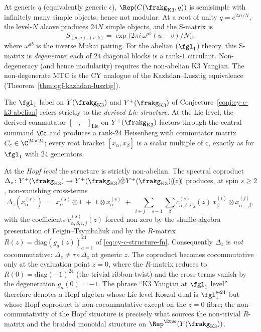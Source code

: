 \begin{remark}
\label{rem:cy-c-root-of-unity}
At generic $q$ (equivalently generic $\epsilon$), $\Rep(C(\frakg_{\mathrm{K3}}, q))$ is semisimple with infinitely many simple objects, hence not modular. At a root of unity $q = e^{2\pi i/N}$, the level-$N$ alcove produces $24 N$ simple objects, and the S-matrix is
\[
 S_{(u,a),(v,b)} = \exp\!\bigl(2\pi i \,\omega^{ab}(u - v)/N\bigr),
\]
where $\omega^{ab}$ is the inverse Mukai pairing. For the abelian ($\fgl_1$) theory, this S-matrix is \emph{degenerate}: each of $24$ diagonal blocks is a rank-$1$ circulant. Non-degeneracy (and hence modularity) requires the non-abelian K3 Yangian. The non-degenerate MTC is the CY analogue of the Kazhdan--Lusztig equivalence (Theorem~\ref{thm:qgf-kazhdan-lusztig}).
\end{remark}

\begin{remark}
\label{rem:qgf-k3-yangian-abelian-lie-nonabelian-hopf}
The $\fgl_1$ label on $Y(\frakg_{\mathrm{K3}})$ and $Y^+(\frakg_{\mathrm{K3}})$ of
Conjecture~\ref{conj:cy-c-k3-abelian} refers strictly to the
\emph{derived Lie structure}. At the Lie level, the derived commutator
$[-,-]_{\mathrm{Lie}}$ on $Y^+(\frakg_{\mathrm{K3}})$ factors through the central
summand $\C\mathsf c$ and produces a rank-$24$ Heisenberg with commutator
matrix $C_c\in\C^{24\times 24}$; every root bracket $[x_\alpha,x_\beta]$
is a scalar multiple of $\mathsf c$, exactly as for $\fgl_1$ with $24$ generators.

At the \emph{Hopf level} the structure is strictly non-abelian. The
spectral coproduct $\Delta_z\colon Y^+(\frakg_{\mathrm{K3}})\to
Y^+(\frakg_{\mathrm{K3}})\hat\otimes Y^+(\frakg_{\mathrm{K3}})(\!(z)\!)$
produces, at spin $s\geq 2$, non-vanishing cross-terms
\[
 \Delta_z(x_\alpha^{(s)})\;=\;x_\alpha^{(s)}\otimes 1\;+\;1\otimes x_\alpha^{(s)}
 \;+\;\sum_{i+j=s-1}\sum_\beta
 c^{(s)}_{\alpha,\beta,i,j}(z)\,x_\beta^{(i)}\otimes x_{\alpha-\beta}^{(j)},
\]
with the coefficients $c^{(s)}_{\alpha,\beta,i,j}(z)$ forced
non-zero by the shuffle-algebra presentation of Feigin--Tsymbaliuk and
by the $R$-matrix $R(z)=\mathrm{diag}(g_a(z))_{a=1}^{24}$ of
\eqref{eq:cy-c-structure-fn}. Consequently $\Delta_z$ is
\emph{not} cocommutative: $\Delta_z\neq\tau\circ\Delta_z$ at generic $z$.
The coproduct becomes cocommutative only at the evaluation point $z=0$,
where the $R$-matrix reduces to $R(0)=\mathrm{diag}(-1)^{24}$ (the
trivial ribbon twist) and the cross-terms vanish by the degeneration
$g_a(0)=-1$.
The phrase ``K3 Yangian at $\fgl_1$ level''
therefore denotes a Hopf algebra whose Lie-level Koszul-dual is $\fgl_1^{\oplus 24}$
but whose Hopf coproduct is non-cocommutative except on the $z=0$
fibre; the non-commutativity of the Hopf structure is precisely what
sources the non-trivial $R$-matrix and the braided monoidal structure
on $\Rep^{\Etwo}(Y(\frakg_{\mathrm{K3}}))$.
\end{remark}

